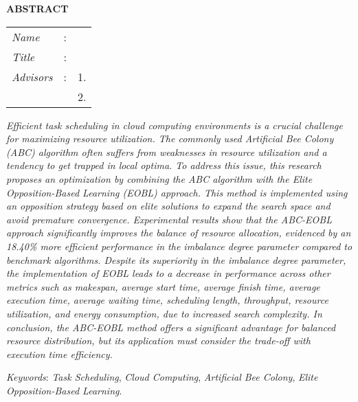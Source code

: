 \begin{center}
  \large\textbf{ABSTRACT}
\end{center}


\vspace{2ex}

\begingroup
\setlength{\tabcolsep}{0pt}

\noindent
\begin{tabularx}{\textwidth}{l >{\centering}m{3em} X}
  \emph{Name}     & : & \name{}         \\

  \emph{Title}    & : & \engtatitle{}   \\

  \emph{Advisors} & : & 1. \advisor{}   \\
                  &   & 2. \coadvisor{} \\
\end{tabularx}
\endgroup

\textit{Efficient task scheduling in cloud computing environments is a crucial challenge for maximizing resource utilization. The commonly used Artificial Bee Colony (ABC) algorithm often suffers from weaknesses in resource utilization and a tendency to get trapped in local optima. To address this issue, this research proposes an optimization by combining the ABC algorithm with the Elite Opposition-Based Learning (EOBL) approach. This method is implemented using an opposition strategy based on elite solutions to expand the search space and avoid premature convergence. Experimental results show that the ABC-EOBL approach significantly improves the balance of resource allocation, evidenced by an 18.40\% more efficient performance in the imbalance degree parameter compared to benchmark algorithms. Despite its superiority in the imbalance degree parameter, the implementation of EOBL leads to a decrease in performance across other metrics such as makespan, average start time, average finish time, average execution time, average waiting time, scheduling length, throughput, resource utilization, and energy consumption, due to increased search complexity. In conclusion, the ABC-EOBL method offers a significant advantage for balanced resource distribution, but its application must consider the trade-off with execution time efficiency.}

\emph{Keywords}: \textit{Task Scheduling}, \textit{Cloud Computing}, \textit{Artificial Bee Colony}, \textit{Elite Opposition-Based Learning}.
